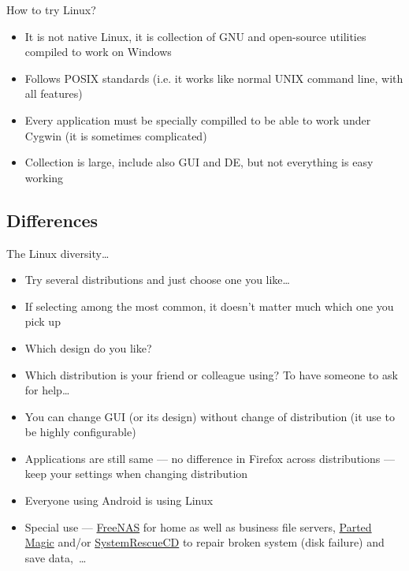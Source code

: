 \documentclass[compress, ucs, xelatex, 11pt, xcolor=svgnames,
  hyperref={
    bookmarks=true,
    unicode=true,
    colorlinks=true,
    pdftitle={Linux, command line and MetaCentrum},
    plainpages=false,
    pdfauthor={Vojtech Zeisek},
    pdfsubject={Course about use of Linux command line, writing shell scripts and using MetaCentrum of CESNET},
    pdfcreator={XeLaTeX},
    pdfkeywords={Linux, GNU, BASH, shell, command line, MetaCentrum},
    linkcolor=DarkRed,
    anchorcolor=DarkBlue,
    citecolor=Indigo,
    filecolor=NavyBlue,
    menucolor=DarkMagenta,
    urlcolor=DarkBlue,
    pdftex},
  url={hyphens, lowtilde} %
  ]{beamer}
\begin{document}
\begin{frame}[allowframebreaks]{How to try Linux?}
\begin{itemize}
\begin{itemize}
      \item It is not native Linux, it is collection of GNU and open-source utilities compiled to work on Windows
      \item Follows POSIX standards (i.e. it works like normal UNIX command line, with all features)
      \item Every application must be specially compilled to be able to work under Cygwin (it is sometimes complicated)
      \item Collection is large, include also GUI and DE, but not everything is easy working
    \end{itemize}
  \end{itemize}
\end{frame}

\subsection{Differences}

\begin{frame}{The Linux diversity\ldots}
  \begin{itemize}
    \item Try several distributions and just choose one you like\ldots
    \item If selecting among the most common, it doesn't matter much which one you pick up
    \item Which design do you like?
    \item Which distribution is your friend or colleague using? To have someone to ask for help\ldots
    \item You can change GUI (or its design) without change of distribution (it use to be highly configurable)
    \item Applications are still same --- no difference in Firefox across distributions --- keep your settings when changing distribution
    \item Everyone using Android is using Linux
    \item Special use --- \href{https://www.freenas.org/}{FreeNAS} for home as well as business file servers, \href{https://partedmagic.com/}{Parted Magic} and/or \href{https://www.system-rescue-cd.org/}{SystemRescueCD} to repair broken system (disk failure) and save data,~\ldots
  \end{itemize}
\end{frame}
\end{document}

